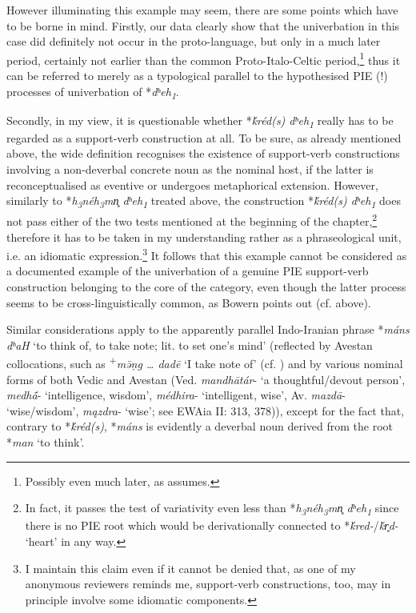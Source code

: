\documentclass[output=paper,colorlinks,citecolor=brown]{langscibook}
\begin{document}
However illuminating this example may seem, there are some points which have to be borne in mind. Firstly, our data clearly show that the univerbation in this case did definitely not occur in the proto-language, but only in a much later period, certainly not earlier than the common Proto-Italo-Celtic period,\footnote{Possibly even much later, as \citet[274]{Weiss2019} assumes.}                        thus it can be referred to merely as a typological parallel to the hypothesised PIE (!) processes of univerbation of *\textit{dʰeh\textsubscript{1}}.

Secondly, in my view, it is questionable whether *\textit{ḱréd(s) dʰeh\textsubscript{1}} really has to be regarded as a support-verb construction at all. To be sure, as already mentioned above, the wide definition recognises the existence of support-verb constructions involving a non-deverbal concrete noun as the nominal host, if the latter is reconceptualised as eventive or undergoes metaphorical extension. However, similarly to *\textit{h\textsubscript{3}néh\textsubscript{3}mn̥ dʰeh\textsubscript{1}} treated above, the construction *\textit{ḱréd(s) dʰeh\textsubscript{1}} does not pass either of the two tests mentioned at the beginning of the chapter,\footnote{In fact, it passes the test of variativity even less than *\textit{h\textsubscript{3}néh\textsubscript{3}mn̥ dʰeh\textsubscript{1}} since there is no PIE root which would be derivationally connected to *\textit{ḱred-}/\textit{ḱr̥d-} ‘heart’ in any way.}            therefore it has to be taken in my understanding rather as a phraseological unit, i.e. an idiomatic expression.\footnote{I maintain this claim even if it cannot be denied that, as one of my anonymous reviewers reminds me, support-verb constructions, too, may in principle involve some idiomatic components.}                    It follows that this example cannot be considered as a documented example of the univerbation of a genuine PIE support-verb construction belonging to the core of the category, even though the latter process seems to be cross-linguistically common, as Bowern points out (cf. above).

Similar considerations apply to the apparently parallel Indo-Iranian phrase *\textit{máns dʰaH} ‘to think of, to take note; lit. to set one’s mind’ (reflected by Avestan collocations, such as \textsuperscript{+}\textit{mǝ̄ṇg … dadē}  ‘I take note of’ (cf. \citealt[178]{Peschl2022}) and by various nominal forms of both Vedic and Avestan (Ved. \textit{mandhātár}- ‘a thoughtful/devout person’, \textit{medhā́}- ‘intelligence, wisdom’, \textit{médhira}- ‘intelligent, wise’, Av. \textit{mazdā}- ‘wise/wisdom’, \textit{mązdra}- ‘wise’; see EWAia II: 313, 378)), except for the fact that, contrary to *\textit{ḱréd(s)}, *\textit{máns} is evidently a deverbal noun derived from the root *\textit{man} ‘to think’.
\end{document}
